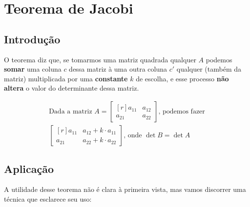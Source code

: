 \chapter{Teorema de Jacobi}

\section{Introdução}
O teorema diz que, se tomarmos uma matriz quadrada qualquer $A$ podemos \textbf{somar} uma coluna $c$ dessa matriz à uma outra coluna $c'$ qualquer (também da matriz) multiplicada por uma \textbf{constante} $k$ de escolha, e esse processo \textbf{não altera} o valor do determinante dessa matriz.

\Example

\begin{gather*}
    \text{Dada a matriz }A=\begin{bmatrix*}[r]
        a_{11} & a_{12} \\
        a_{21} & a_{22}
    \end{bmatrix*} \text{, podemos fazer} \\
    \begin{bmatrix*}[r]
        a_{11} & a_{12} + k \cdot a_{11} \\
        a_{21} & a_{22} + k \cdot a_{22}
    \end{bmatrix*} \text{, onde } \det B = \det A
\end{gather*}

\section{Aplicação}
A utilidade desse teorema não é clara à primeira vista, mas vamos discorrer uma técnica que esclarece seu uso:

